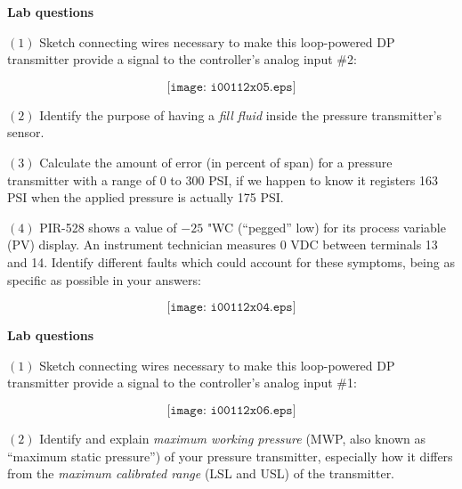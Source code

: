 \vfil \eject

\noindent
{\bf Lab questions}

\vskip 20pt

\item{$(1)$} Sketch connecting wires necessary to make this loop-powered DP transmitter provide a signal to the controller's analog input \#2:

$$\texttt{[image: i00112x05.eps]}$$

\vskip 20pt

\item{$(2)$} Identify the purpose of having a {\it fill fluid} inside the pressure transmitter's sensor.

\vskip 20pt

\item{$(3)$} Calculate the amount of error (in percent of span) for a pressure transmitter with a range of 0 to 300 PSI, if we happen to know it registers 163 PSI when the applied pressure is actually 175 PSI.

\vskip 20pt

\item{$(4)$} PIR-528 shows a value of $-25$ "WC (``pegged'' low) for its process variable (PV) display.  An instrument technician measures 0 VDC between terminals 13 and 14.  Identify  different faults which could account for these symptoms, being as specific as possible in your answers:

$$\texttt{[image: i00112x04.eps]}$$








\vfil \eject

\noindent
{\bf Lab questions}

\vskip 20pt

\item{$(1)$} Sketch connecting wires necessary to make this loop-powered DP transmitter provide a signal to the controller's analog input \#1:

$$\texttt{[image: i00112x06.eps]}$$

\vskip 20pt

\item{$(2)$} Identify and explain {\it maximum working pressure} (MWP, also known as ``maximum static pressure'') of your pressure transmitter, especially how it differs from the {\it maximum calibrated range} (LSL and USL) of the transmitter.

